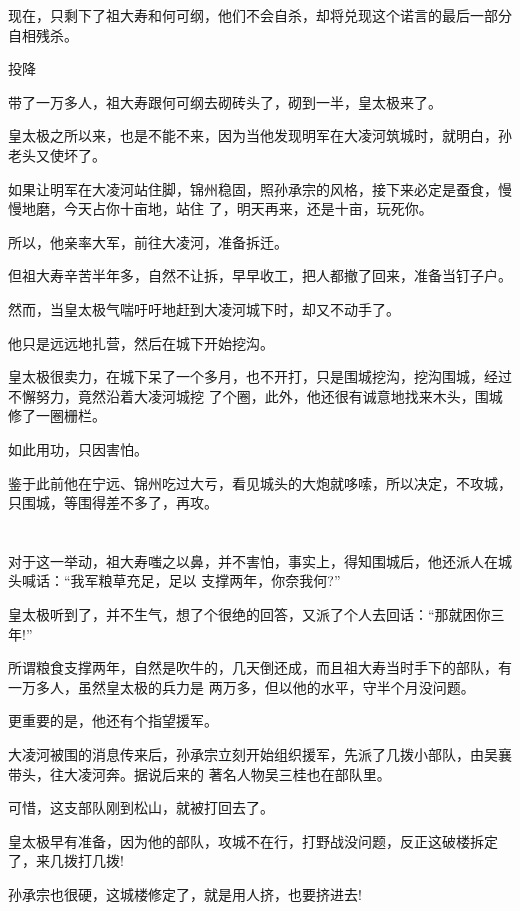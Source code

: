 \documentclass[11pt,a4paper,onecolumn]{article}
\begin{document}
现在，只剩下了祖大寿和何可纲，他们不会自杀，却将兑现这个诺言的最后一部分\myrule 自相残杀。

投降

带了一万多人，祖大寿跟何可纲去砌砖头了，砌到一半，皇太极来了。

皇太极之所以来，也是不能不来，因为当他发现明军在大凌河筑城时，就明白，孙老头又使坏了。

如果让明军在大凌河站住脚，锦州稳固，照孙承宗的风格，接下来必定是蚕食，慢慢地磨，今天占你十亩地，站住
了，明天再来，还是十亩，玩死你。

所以，他亲率大军，前往大凌河，准备拆迁。

但祖大寿辛苦半年多，自然不让拆，早早收工，把人都撤了回来，准备当钉子户。

然而，当皇太极气喘吁吁地赶到大凌河城下时，却又不动手了。

他只是远远地扎营，然后在城下开始挖沟。

皇太极很卖力，在城下呆了一个多月，也不开打，只是围城挖沟，挖沟围城，经过不懈努力，竟然沿着大凌河城挖
了个圈，此外，他还很有诚意地找来木头，围城修了一圈栅栏。

如此用功，只因害怕。

鉴于此前他在宁远、锦州吃过大亏，看见城头的大炮就哆嗦，所以决定，不攻城，只围城，等围得差不多了，再攻。

\section[\thesection]{}

对于这一举动，祖大寿嗤之以鼻，并不害怕，事实上，得知围城后，他还派人在城头喊话：``我军粮草充足，足以
支撑两年，你奈我何?''

皇太极听到了，并不生气，想了个很绝的回答，又派了个人去回话：``那就困你三年!''

所谓粮食支撑两年，自然是吹牛的，几天倒还成，而且祖大寿当时手下的部队，有一万多人，虽然皇太极的兵力是
两万多，但以他的水平，守半个月没问题。

更重要的是，他还有个指望\myrule 援军。

大凌河被围的消息传来后，孙承宗立刻开始组织援军，先派了几拨小部队，由吴襄带头，往大凌河奔。据说后来的
著名人物吴三桂也在部队里。

可惜，这支部队刚到松山，就被打回去了。

皇太极早有准备，因为他的部队，攻城不在行，打野战没问题，反正这破楼拆定了，来几拨打几拨!

孙承宗也很硬，这城楼修定了，就是用人挤，也要挤进去!
\end{document}
